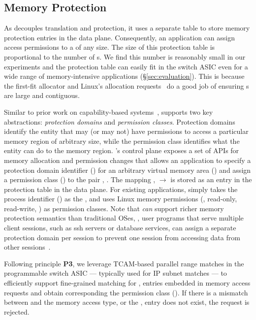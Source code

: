 \subsection{Memory Protection}
\label{subsec:mem_prot}

As \mind decouples translation and protection, it uses a separate table to store memory protection entries in the data plane. 
Consequently, an application can assign access permissions to a  of any size.
The size of this protection table is proportional to the number of s. We find this number is reasonably small in our experiments and the protection table can easily fit in the switch ASIC even for a wide range of memory-intensive applications (\S\ref{sec:evaluation}). This is because the first-fit allocator and Linux's  allocation requests~\cite{glibc-alloc} do a good job of ensuring s are large and contiguous. 

 Similar to prior work on capability-based systems~\cite{cheri, capabilityaddr}, \mind supports two key abstractions: \textit{protection domains} and \textit{permission classes}. Protection domains identify the entity that may (or may not) have permissions to access a particular memory region of arbitrary size, while the permission class identifies what the entity can do to the memory region. 
\mind's control plane exposes a set of APIs for memory allocation and permission changes that allows an application to specify a protection domain identifier () for an arbitrary virtual memory area () and assign a permission class () to the pair , . 
The mapping ,  $\rightarrow$  is stored as an entry in the protection table in the data plane. For existing applications, \mind simply takes the process identifier () as the ,  and uses Linux memory permissions (\eg, read-only, read-write, \etc) as permission classes. Note that \mind \textit{can} support richer memory protection semantics than traditional OSes, \eg, user programs that serve multiple client sessions, such as ssh servers or database services, can assign a separate protection domain per session to prevent one session from accessing data from other sessions~\cite{cheri}. 

Following principle \textbf{P3}, we leverage TCAM-based parallel range matches in the programmable switch ASIC --- typically used for IP subnet matches --- to efficiently support fine-grained matching for ,  entries embedded in memory access requests and obtain corresponding the permission class (). If there is a mismatch between  and the memory access type, or the ,  entry does not exist, the request is rejected.

